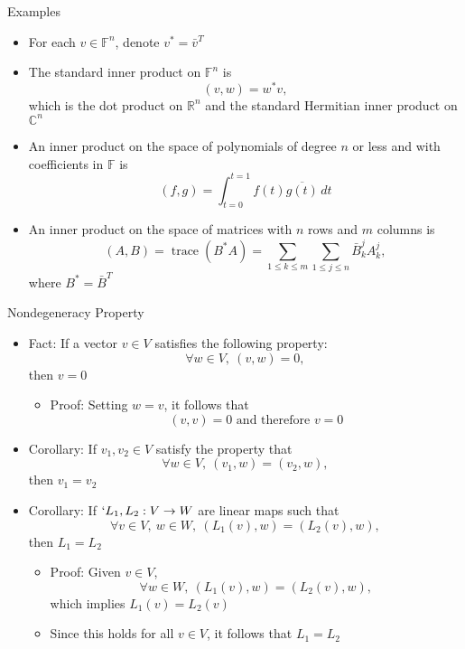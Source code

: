 \documentclass[usenames,dvipsnames,10pt]{beamer}
\newcommand\C{\mathbb{C}}
\newcommand\F{\mathbb{F}}
\newcommand{\R}{\mathbb{R}}
\newcommand\trace{\operatorname{trace}}
\begin{document}
\begin{frame}
  {Examples}

  \begin{itemize}
  \item For each $v \in \F^n$, denote $v^* = \bar{v}^T$
  \item The standard inner product on $\F^n$ is
    \[
      (v,w) = w^*v,
    \]
    which is the dot product on $\R^n$ and the standard Hermitian inner product on $\C^n$
  \item An inner product on the space of polynomials of degree $n$ or less and with coefficients in $\F$ is
    \[
      (f,g) = \int_{t=0}^{t=1} f(t)\overline{g(t)}\,dt
    \]
  \item An inner product on the space of matrices with $n$ rows and $m$ columns is
    \[
      (A,B) = \trace(B^*A) = \sum_{1\le k\le m}\sum_{1\le j\le n} \bar{B}^j_kA^j_k,
    \]
    where $B^* = \bar{B}^T$
  \end{itemize}
\end{frame}

\begin{frame}
  {Nondegeneracy Property}

  \begin{itemize}
  \item Fact: If a vector $v \in V$ satisfies the following property:
    \[
      \forall w \in V,\ (v,w) = 0,
    \]
    then $v = 0$
    \begin{itemize}
    \item Proof: Setting $w = v$, it follows that
      \[
        (v,v) = 0\text{ and therefore }v=0
      \]
    \end{itemize}
  \item Corollary: If $v_1, v_2 \in V$ satisfy the property that
    \[
      \forall w\in V,\ (v_1,w) = (v_2,w),
    \]
    then $v_1 = v_2$
  \item Corollary: If $`L_1, L_2: V \rightarrow W$ are linear maps such that
    \[
      \forall v\in V,\ w \in W,\ (L_1(v),w) = (L_2(v),w),
    \]
    then $L_1=L_2$
    \begin{itemize}
    \item Proof: Given $v \in V$,
      \[
        \forall w \in W,\ (L_1(v),w) = (L_2(v),w),
      \]
      which implies $L_1(v)=L_2(v)$
    \item Since this holds for all $v \in V$, it follows that $L_1=L_2$
    \end{itemize}
  \end{itemize}
\end{frame}
\end{document}
